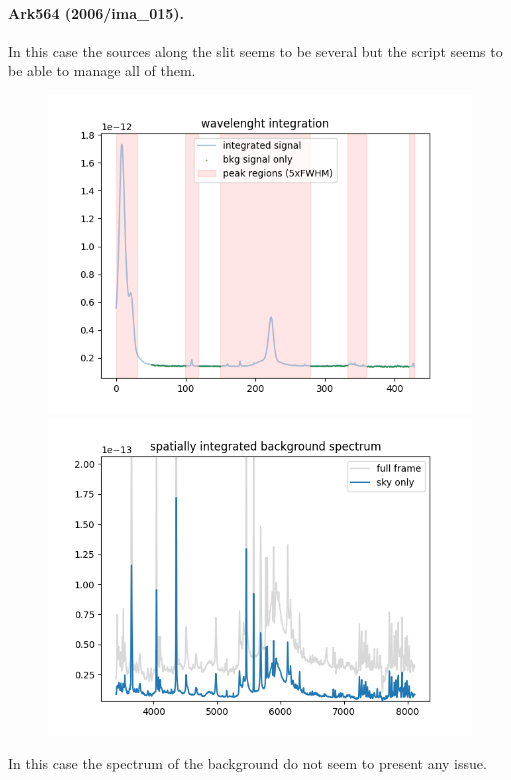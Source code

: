 \documentclass{article}
\begin{document}
\paragraph{Ark564 (2006/ima\_015).} In this case the sources along the slit seems to be several but the script seems to be able to manage all of them.
\begin{figure}[h!]
	\begin{minipage}{.49\textwidth}
		\centering
		\includegraphics[width=\textwidth]{15_1}
	\end{minipage}
	\hfill
	\begin{minipage}{.49\textwidth}
		\centering
		\includegraphics[width=\textwidth]{15_2}
	\end{minipage}
\end{figure}
In this case the spectrum of the background do not seem to present any issue.
\end{document}
